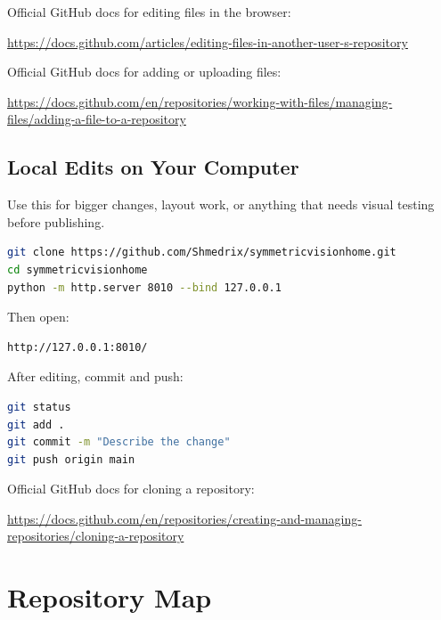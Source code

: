 \documentclass[11pt]{article}
\begin{document}
Official GitHub docs for editing files in the browser:

\url{https://docs.github.com/articles/editing-files-in-another-user-s-repository}

Official GitHub docs for adding or uploading files:

\url{https://docs.github.com/en/repositories/working-with-files/managing-files/adding-a-file-to-a-repository}

\subsection{Local Edits on Your Computer}

Use this for bigger changes, layout work, or anything that needs visual testing before publishing.

\begin{lstlisting}[language=bash]
git clone https://github.com/Shmedrix/symmetricvisionhome.git
cd symmetricvisionhome
python -m http.server 8010 --bind 127.0.0.1
\end{lstlisting}

Then open:

\begin{lstlisting}
http://127.0.0.1:8010/
\end{lstlisting}

After editing, commit and push:

\begin{lstlisting}[language=bash]
git status
git add .
git commit -m "Describe the change"
git push origin main
\end{lstlisting}

Official GitHub docs for cloning a repository:

\url{https://docs.github.com/en/repositories/creating-and-managing-repositories/cloning-a-repository}

\section{Repository Map}
\end{document}
